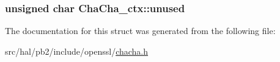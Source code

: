 \subsubsection[{\texorpdfstring{unused}{unused}}]{\setlength{\rightskip}{0pt plus 5cm}unsigned char Cha\+Cha\+\_\+ctx\+::unused}\hypertarget{struct_cha_cha__ctx_af90c0b840ad1c93389c9db31dd294b54}{}\label{struct_cha_cha__ctx_af90c0b840ad1c93389c9db31dd294b54}


The documentation for this struct was generated from the following file\+:\begin{DoxyCompactItemize}
\item 
src/hal/pb2/include/openssl/\hyperlink{chacha_8h}{chacha.\+h}\end{DoxyCompactItemize}
